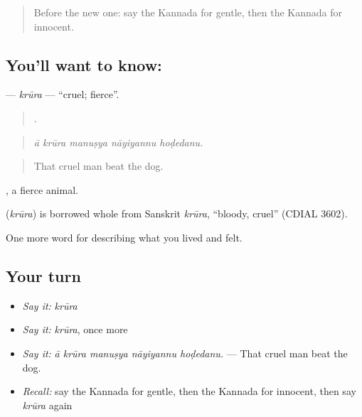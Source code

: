 \label{lesson:KA-C501-krura}



\begin{quote}
Before the new one: say the Kannada for gentle, then the Kannada for innocent.
\end{quote}

\subsection*{You'll want to know: }
\textbf{} — \emph{krūra} — \textquotedblleft{}cruel; fierce\textquotedblright{}.

\begin{quote}
    .
\end{quote}

\begin{quote}
\emph{ā krūra manuṣya nāyiyannu hoḍedanu.}
\end{quote}

\begin{quote}
That cruel man beat the dog.
\end{quote}

 , a fierce animal.

\begin{cousinweb}
\textbf{} (\emph{krūra}) is borrowed whole from Sanskrit \emph{krūra}, \textquotedblleft{}bloody, cruel\textquotedblright{} (CDIAL 3602).
\end{cousinweb}

\begin{grammarlens}[title={What you've built}]
One more word for describing what you lived and felt.
\end{grammarlens}

\subsection*{Your turn}
\begin{itemize}
\raggedright
  \item \emph{Say it:} \emph{krūra}
  \item \emph{Say it:} \emph{krūra}, once more
  \item \emph{Say it:} \emph{ā krūra manuṣya nāyiyannu hoḍedanu.} — That cruel man beat the dog.
  \item \emph{Recall:} say the Kannada for gentle, then the Kannada for innocent, then say \emph{krūra} again
\end{itemize}

